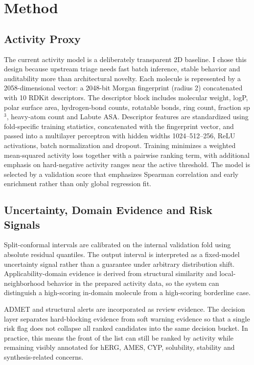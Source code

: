 \documentclass[manuscript=article]{achemso}
\begin{document}
\section{Method}
\subsection{Activity Proxy}
The current activity model is a deliberately transparent 2D
baseline. I chose this design because upstream triage needs fast batch
inference, stable behavior and auditability more than architectural novelty.
Each molecule is represented by a 2058-dimensional vector: a 2048-bit Morgan
fingerprint (radius 2) concatenated with 10 RDKit descriptors. The descriptor
block includes molecular weight, logP, polar surface area, hydrogen-bond
counts, rotatable bonds, ring count, fraction sp$^3$, heavy-atom count and
Labute ASA. Descriptor features are standardized using fold-specific training
statistics, concatenated with the fingerprint vector, and passed into a
multilayer perceptron with hidden widths 1024--512--256, ReLU activations,
batch normalization and dropout. Training minimizes a weighted mean-squared
activity loss together with a pairwise ranking term, with additional emphasis
on hard-negative activity ranges near the active threshold. The model is
selected by a validation score that emphasizes Spearman correlation and early
enrichment rather than only global regression fit.

\subsection{Uncertainty, Domain Evidence and Risk Signals}
Split-conformal intervals are calibrated on the internal validation fold using
absolute residual quantiles. The output interval is interpreted as a
fixed-model uncertainty signal rather than a guarantee under arbitrary
distribution shift. Applicability-domain evidence is derived from structural
similarity and local-neighborhood behavior in the prepared activity data, so
the system can distinguish a high-scoring in-domain molecule from a
high-scoring borderline case.

ADMET and structural alerts are incorporated as review evidence. The decision
layer separates hard-blocking evidence from soft warning evidence so that a
single risk flag does not collapse all ranked candidates into the same
decision bucket. In practice, this means the front of the list can still be
ranked by activity while remaining visibly annotated for hERG, AMES, CYP,
solubility, stability and synthesis-related concerns.
\end{document}
